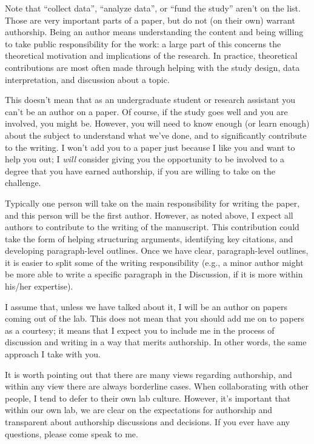 \documentclass[letterpaper,12pt,oneside]{memoir}
\begin{document}
{Note that ``collect data'', ``analyze data'', or ``fund the study'' aren't on the list. Those are very important parts of a paper, but do not (on their own) warrant authorship. Being an author means understanding the content and being willing to take public responsibility for the work: a large part of this concerns the theoretical motivation and implications of the research. In practice, theoretical contributions are most often made through helping with the study design, data interpretation, and discussion about a topic.

This doesn't mean that as an undergraduate student or research assistant you can't be an author on a paper. Of course, if the study goes well and you are involved, you might be. However, you will need to know enough (or learn enough) about the subject to understand what we've done, and to significantly contribute to the writing. I won't add you to a paper just because I like you and want to help you out; I {\itshape will} consider giving you the opportunity to be involved to a degree that you have earned authorship, if you are willing to take on the challenge.

Typically one person will take on the main responsibility for writing the paper, and this person will be the first author. However, as noted above, I expect all authors to contribute to the writing of the manuscript. This contribution could take the form of helping structuring arguments, identifying key citations, and developing paragraph-level outlines. Once we have clear, paragraph-level outlines, it is easier to split some of the writing responsibility (e.g., a minor author might be more able to write a specific paragraph in the Discussion, if it is more within his/her expertise).

I assume that, unless we have talked about it, I will be an author on papers coming out of the lab. This does not mean that you should add me on to papers as a courtesy; it means that I expect you to include me in the process of discussion and writing in a way that merits authorship. In other words, the same approach I take with you.

It is worth pointing out that there are many views regarding authorship, and within any view there are always borderline cases. When collaborating with other people, I tend to defer to their own lab culture. However, it's important that within our own lab, we are clear on the expectations for authorship and transparent about authorship discussions and decisions. If you ever have any questions, please come speak to me.


}
\end{document}
